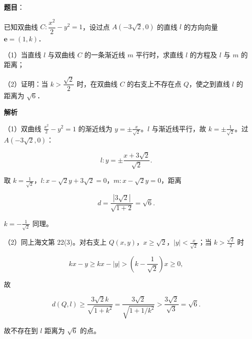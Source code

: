 \begin{answer}

\textbf{题目}：

已知双曲线 $C:\dfrac{x^2}{2}-y^2=1$，设过点 $A(-3\sqrt2,0)$ 的直线 $l$ 的方向向量 $\boldsymbol e=(1,k)$．

（1）当直线 $l$ 与双曲线 $C$ 的一条渐近线 $m$ 平行时，求直线 $l$ 的方程及 $l$ 与 $m$ 的距离；

（2）证明：当 $k>\dfrac{\sqrt2}{2}$ 时，在双曲线 $C$ 的右支上不存在点 $Q$，使之到直线 $l$ 的距离为 $\sqrt6$．

\textbf{解析}

（1）双曲线 $\frac{x^2}{2}-y^2=1$ 的渐近线为 $y=\pm\frac{x}{\sqrt2}$。$l$ 与渐近线平行，故 $k=\pm\frac{1}{\sqrt2}$。过 $A(-3\sqrt2,0)$：

\nopagebreak[4]
\[l:y=\pm\frac{x+3\sqrt2}{\sqrt2}.\]

取 $k=\frac{1}{\sqrt2}$，$l:x-\sqrt2y+3\sqrt2=0$，$m:x-\sqrt2y=0$，距离

\nopagebreak[4]
\[d=\frac{|3\sqrt2|}{\sqrt{1+2}}=\sqrt6 .\]

$k=-\frac{1}{\sqrt2}$ 同理。

（2）同上海文第 22(3)。对右支上 $Q(x,y)$，$x\geqslant\sqrt2$，$|y|<\frac{x}{\sqrt2}$；当 $k>\frac{\sqrt2}{2}$ 时

\nopagebreak[4]
\[kx-y\geqslant kx-|y|>\left(k-\frac1{\sqrt2}\right)x\geqslant0,\]

故

\nopagebreak[4]
\[d(Q,l)\geqslant\frac{3\sqrt2k}{\sqrt{1+k^2}}
=\frac{3\sqrt2}{\sqrt{1+1/k^2}}>\frac{3\sqrt2}{\sqrt3}=\sqrt6 .\]

故不存在到 $l$ 距离为 $\sqrt6$ 的点。


\end{answer}

